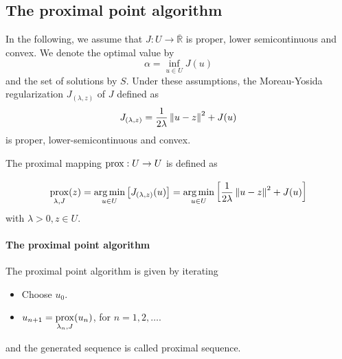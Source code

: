 \subsection{The proximal point algorithm}
In the following, we assume that $J:U\rightarrow \overline{\mathbb{R}}$ is proper, lower semicontinuous and convex. We denote the optimal value by
\[
	\alpha = \inf_{u\in U} J(u)
\]
and the set of solutions by $S$.
Under these assumptions, the Moreau-Yosida regularization $J_{(\lambda, z)}$ of $J$ defined as
\[
J_{(\lambda, z)} = \frac{1}{2\lambda}\left\lVert u-z\right\rVert^2 + J(u)	
\]
is proper, lower-semicontinuous and convex.

\begin{definition}
	The proximal mapping ${\displaystyle {\underset {}{\operatorname {prox} }}}: U\rightarrow U$ is defined as
	\[
		{\displaystyle {\underset {\lambda, J}{\operatorname {prox} }}(z)}={\displaystyle {\underset {u\in U}{\operatorname {arg\,min} }}\left[J_{(\lambda, z)}(u)\right]} ={\displaystyle {\underset {u\in U}{\operatorname {arg\,min} }}\left[ \frac{1}{2\lambda}\left\lVert u-z\right\rVert^2 + J(u)\right]}
	\]
	with $\lambda >0, z \in U$.
\end{definition}

\paragraph{The proximal point algorithm}
The proximal point algorithm is given by iterating
	\begin{itemize}
		\item Choose $u_0$.
		\item $u_{n+1}= {\displaystyle {\underset {\lambda_n, J}{\operatorname {prox} }}(u_n)}$, for $n=1,2,\dots$.
	\end{itemize}
and the generated sequence is called proximal sequence.

